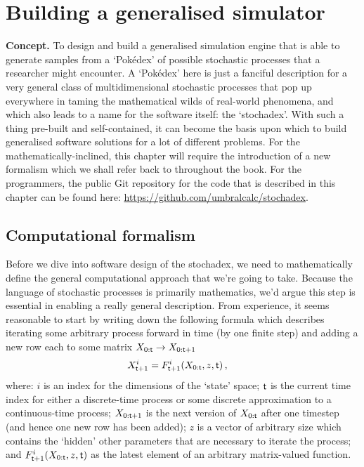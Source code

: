 \chapter{\sffamily Building a generalised simulator}

{\bfseries\sffamily Concept.} To design and build a generalised simulation engine that is able to generate samples from a `Pokédex' of possible stochastic processes that a researcher might encounter. A `Pokédex' here is just a fanciful description for a very general class of multidimensional stochastic processes that pop up everywhere in taming the mathematical wilds of real-world phenomena, and which also leads to a name for the software itself: the `stochadex'. With such a thing pre-built and self-contained, it can become the basis upon which to build generalised software solutions for a lot of different problems. For the mathematically-inclined, this chapter will require the introduction of a new formalism which we shall refer back to throughout the book. For the programmers, the public Git repository for the code that is described in this chapter can be found here: \href{https://github.com/umbralcalc/stochadex}{https://github.com/umbralcalc/stochadex}.

\section{\sffamily Computational formalism}

Before we dive into software design of the stochadex, we need to mathematically define the general computational approach that we're going to take. Because the language of stochastic processes is primarily mathematics, we'd argue this step is essential in enabling a really general description. From experience, it seems reasonable to start by writing down the following formula which describes iterating some arbitrary process forward in time (by one finite step) and adding a new row each to some matrix $X_{0:{\sf t}} \rightarrow X_{0:{\sf t}+1}$
\begin{align}
X^{i}_{{\sf t}+1} &= F^{i}_{{\sf t}+1}(X_{0:{\sf t}},z,{\sf t}) \,, \label{eq:x-step-def}
\end{align}
where: $i$ is an index for the dimensions of the `state' space; ${\sf t}$ is the current time index for either a discrete-time process or some discrete approximation to a continuous-time process; $X_{0:{\sf t}+1}$ is the next version of $X_{0:{\sf t}}$ after one timestep (and hence one new row has been added); $z$ is a vector of arbitrary size which contains the `hidden' other parameters that are necessary to iterate the process; and $F^i_{{\sf t}+1}(X_{0:{\sf t}},z,{\sf t})$ as the latest element of an arbitrary matrix-valued function. 

